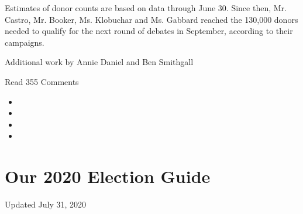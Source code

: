 Estimates of donor counts are based on data through June 30. Since then,
Mr. Castro, Mr. Booker, Ms. Klobuchar and Ms. Gabbard reached the
130,000 donors needed to qualify for the next round of debates in
September, according to their campaigns.

Additional work by Annie Daniel and Ben Smithgall

Read 355 Comments

\begin{itemize}
\item
\item
\item
\item
\end{itemize}

\hypertarget{our-2020-election-guide}{%
\section{Our 2020 Election Guide}\label{our-2020-election-guide}}

Updated July 31, 2020

